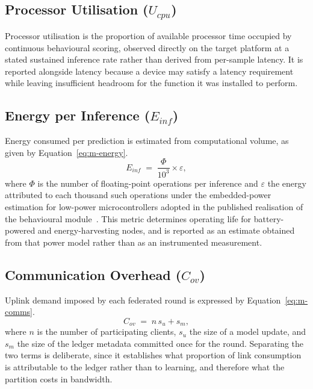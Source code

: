 \subsection{Processor Utilisation ($U_{cpu}$)}
\label{sec:metric-cpu}

Processor utilisation is the proportion of available processor time occupied by continuous behavioural scoring, observed directly on the target platform at a stated sustained inference rate rather than derived from per-sample latency. It is reported alongside latency because a device may satisfy a latency requirement while leaving insufficient headroom for the function it was installed to perform.

\subsection{Energy per Inference ($E_{inf}$)}
\label{sec:metric-energy}

Energy consumed per prediction is estimated from computational volume, as given by Equation~\eqref{eq:m-energy}.
\begin{equation}
\label{eq:m-energy}
E_{inf} \;=\; \frac{\Phi}{10^{3}} \times \varepsilon ,
\end{equation}
where $\Phi$ is the number of floating-point operations per inference and $\varepsilon$ the energy attributed to each thousand such operations under the embedded-power estimation for low-power microcontrollers adopted in the published realisation of the behavioural module~\cite{amadi2026lightweight}. This metric determines operating life for battery-powered and energy-harvesting nodes, and is reported as an estimate obtained from that power model rather than as an instrumented measurement.

\subsection{Communication Overhead ($C_{ov}$)}
\label{sec:metric-comms}

Uplink demand imposed by each federated round is expressed by Equation~\eqref{eq:m-comms}.
\begin{equation}
\label{eq:m-comms}
C_{ov} \;=\; n \, s_{u} + s_{m} ,
\end{equation}
where $n$ is the number of participating clients, $s_{u}$ the size of a model update, and $s_{m}$ the size of the ledger metadata committed once for the round. Separating the two terms is deliberate, since it establishes what proportion of link consumption is attributable to the ledger rather than to learning, and therefore what the partition costs in bandwidth.

